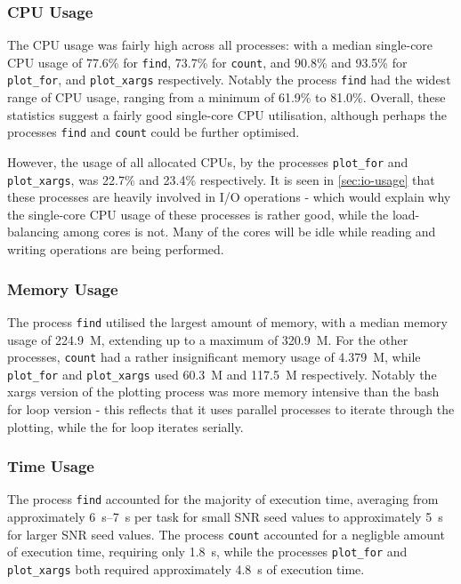 \documentclass{article}
\begin{document}
\subsubsection{CPU Usage}
\label{sec:cpu-usage}

The CPU usage was fairly high across all processes: with a median single-core
CPU usage of 77.6\% for \lstinline{find},  73.7\% for \lstinline{count}, and
90.8\% and 93.5\% for \lstinline{plot_for}, and \lstinline{plot_xargs}
respectively.
Notably the process \lstinline{find} had the widest range of CPU usage, ranging
from a minimum of 61.9\% to 81.0\%.
Overall, these statistics suggest a fairly good single-core CPU utilisation,
although perhaps the processes \lstinline{find} and \lstinline{count} could be
further optimised.

However, the usage of all allocated CPUs, by the processes \lstinline{plot_for}
and \lstinline{plot_xargs}, was 22.7\% and 23.4\% respectively.
It is seen in \autoref{sec:io-usage} that these processes are heavily involved
in I/O operations - which would explain why the single-core CPU usage of these
processes is rather good, while the load-balancing among cores is not.
Many of the cores will be idle while reading and writing operations are
being performed.

\subsubsection{Memory Usage}
\label{sec:memory-usage}

The process \lstinline{find} utilised the largest amount of memory, with a
median memory usage of \SI{224.9}{M}, extending up to a maximum of
\SI{320.9}{M}.
For the other processes, \lstinline{count} had a rather insignificant memory
usage of \SI{4.379}{M}, while \lstinline{plot_for} and \lstinline{plot_xargs}
used \SI{60.3}{M} and \SI{117.5}{M} respectively.
Notably the xargs version of the plotting process was more memory intensive than
the bash for loop version - this reflects that it uses parallel processes to
iterate through the plotting, while the for loop iterates serially.

\subsubsection{Time Usage}
\label{sec:time-usage}

The process \lstinline{find} accounted for the majority of execution time,
averaging from approximately \SIrange{6}{7}{\second} per task for small SNR seed
values to approximately \SI{5}{\second} for larger SNR seed values.
The process \lstinline{count} accounted for a negligble amount of execution
time, requiring only \SI{1.8}{\second}, while the processes
\lstinline{plot_for} and \lstinline{plot_xargs} both required approximately
\SI{4.8}{\second} of execution time.
\end{document}
